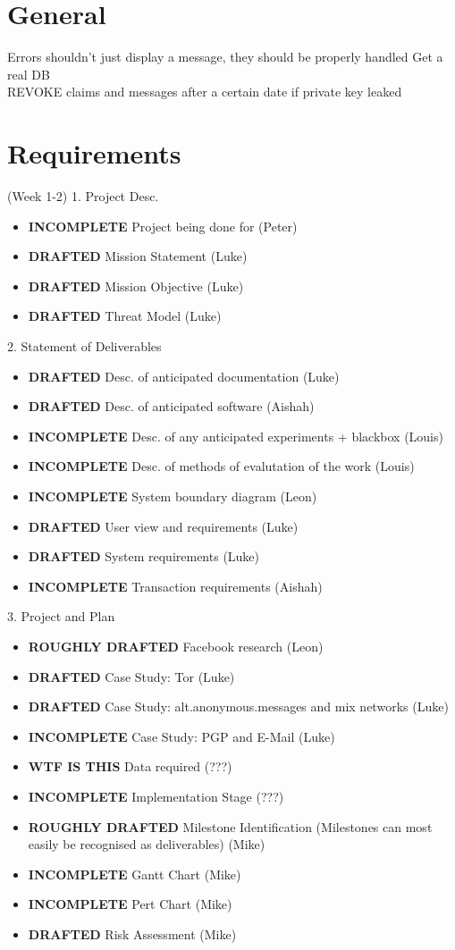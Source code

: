 \section{General}
Errors shouldn't just display a message, they should be properly handled
Get a real DB\\
REVOKE claims and messages after a certain date if private key leaked\\

\section{Requirements} (Week 1-2)
1. Project Desc.
\begin{itemize}
\item \textbf{INCOMPLETE} Project being done for (Peter)
\item \textbf{DRAFTED} Mission Statement (Luke)
\item \textbf{DRAFTED} Mission Objective (Luke)
\item \textbf{DRAFTED} Threat Model (Luke)
\end{itemize}

2. Statement of Deliverables
\begin{itemize}
\item \textbf{DRAFTED} Desc. of anticipated documentation (Luke)
\item \textbf{DRAFTED} Desc. of anticipated software (Aishah)
\item \textbf{INCOMPLETE} Desc. of any anticipated experiments + blackbox (Louis)
\item \textbf{INCOMPLETE} Desc. of methods of evalutation of the work (Louis)
\item \textbf{INCOMPLETE} System boundary diagram (Leon)
\item \textbf{DRAFTED} User view and requirements (Luke)
\item \textbf{DRAFTED} System requirements (Luke)
\item \textbf{INCOMPLETE} Transaction requirements (Aishah)
\end{itemize}

3. Project and Plan
\begin{itemize}
\item \textbf{ROUGHLY DRAFTED} Facebook research (Leon)
\item \textbf{DRAFTED} Case Study: Tor (Luke)
\item \textbf{DRAFTED} Case Study: alt.anonymous.messages and mix networks (Luke)
\item \textbf{INCOMPLETE} Case Study: PGP and E-Mail (Luke)
\item \textbf{WTF IS THIS} Data required (???)
\item \textbf{INCOMPLETE} Implementation Stage (???)
\item \textbf{ROUGHLY DRAFTED} Milestone Identification (Milestones can most easily be recognised as deliverables) (Mike)
\item \textbf{INCOMPLETE} Gantt Chart (Mike)
\item \textbf{INCOMPLETE} Pert Chart (Mike)
\item \textbf{DRAFTED} Risk Assessment (Mike)
\end{itemize}

